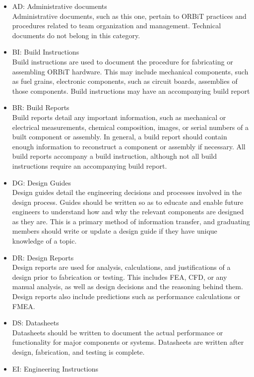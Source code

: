 \documentclass[12pt,article]{memoir}
\begin{document}
\begin{itemize}
\item AD: Administrative documents\\
Administrative documents, such as this one, pertain to ORBiT practices and procedures related to team organization and management. Technical documents do not belong in this category.
\item BI: Build Instructions\\
Build instructions are used to document the procedure for fabricating or assembling ORBiT hardware. This may include mechanical components, such as fuel grains, electronic components, such as circuit boards, assemblies of those components. Build instructions may have an accompanying build report
\item BR: Build Reports\\
Build reports detail any important information, such as mechanical or electrical measurements, chemical composition, images, or serial numbers of a built component or assembly. In general, a build report should contain enough information to reconstruct a component or assembly if necessary. All build reports accompany a build instruction, although not all build instructions require an accompanying build report.
\item DG: Design Guides\\
Design guides detail the engineering decisions and processes involved in the design process. Guides should be written so as to educate and enable future engineers to understand how and why the relevant components are designed as they are. This is a primary method of information transfer, and graduating members should write or update a design guide if they have unique knowledge of a topic.
\item DR: Design Reports\\
Design reports are used for analysis, calculations, and justifications of a design prior to fabrication or testing. This includes FEA, CFD, or any manual analysis, as well as design decisions and the reasoning behind them. Design reports also include predictions such as performance calculations or FMEA.
\item DS: Datasheets\\
Datasheets should be written to document the actual performance or functionality for major components or systems. Datasheets are written after design, fabrication, and testing is complete.
\item EI: Engineering Instructions\\

\end{itemize}
\end{document}
